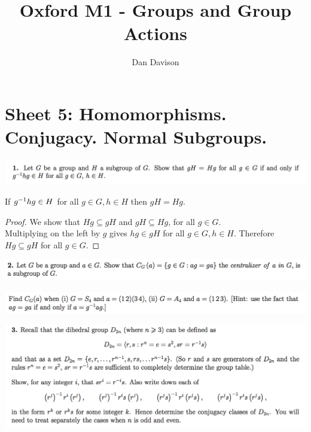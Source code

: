\documentclass[12pt]{article}
\begin{document}
\title{Oxford M1 - Groups and Group Actions }
\author{Dan Davison}
\maketitle

\section{Sheet 5: Homomorphisms. Conjugacy. Normal Subgroups.}

\begin{mdframed}
\includegraphics[width=400pt]{img/abstract-algebra-oxford-M1-5-1.png}
\end{mdframed}

\begin{claim*}
  If $g^{-1}hg \in H$ for all $g \in G, h \in H$ then $gH = Hg$.
\end{claim*}

\begin{proof} We show that $Hg \subseteq gH$ and $gH \subseteq Hg$, for all $g \in G$.\\

Multiplying on the left by $g$ gives $hg \in gH$ for all $g \in G, h \in H$. Therefore $Hg \subseteq gH$ for all $g \in G$.
\end{proof}

\begin{mdframed}
\includegraphics[width=400pt]{img/abstract-algebra-oxford-M1-5-2-1.png}
\end{mdframed}

\begin{mdframed}
\includegraphics[width=400pt]{img/abstract-algebra-oxford-M1-5-2-2.png}
\end{mdframed}

\begin{mdframed}
\includegraphics[width=400pt]{img/abstract-algebra-oxford-M1-5-3.png}
\end{mdframed}
\end{document}
